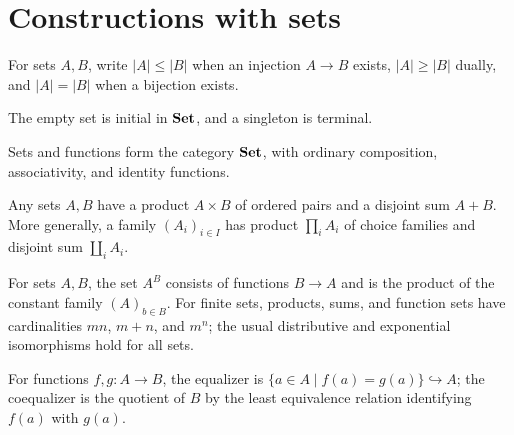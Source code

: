 \section{Constructions with sets}
\begin{definition}
\label{def:lbc-cardinality}
For sets $A,B$, write $|A|\le |B|$ when an injection $A\to B$ exists,
$|A|\ge|B|$ dually, and $|A|=|B|$ when a bijection exists.
\end{definition}

\begin{definition}
\label{def:lbc-empty-singleton}
The empty set is initial in $\mathbf{Set}$, and a singleton is terminal.
\end{definition}

\begin{remark}
\label{rem:lbc-set-category}
Sets and functions form the category $\mathbf{Set}$, with ordinary composition,
associativity, and identity functions.
\end{remark}

\begin{definition}
\label{def:lbc-set-products-sums}
Any sets $A,B$ have a product $A\times B$ of ordered pairs and a disjoint sum
$A+B$. More generally, a family $(A_i)_{i\in I}$ has product
$\prod_iA_i$ of choice families and disjoint sum $\coprod_iA_i$.
\end{definition}

\begin{definition}
\label{def:lbc-set-function-set}
For sets $A,B$, the set $A^B$ consists of functions $B\to A$ and is the
product of the constant family $(A)_{b\in B}$. For finite sets, products, sums,
and function sets have cardinalities $mn$, $m+n$, and $m^n$; the usual
distributive and exponential isomorphisms hold for all sets.
\end{definition}

\begin{definition}
\label{def:lbc-set-equalizer}
For functions $f,g:A\to B$, the equalizer is
$\{a\in A\mid f(a)=g(a)\}\hookrightarrow A$; the coequalizer is the quotient
of $B$ by the least equivalence relation identifying $f(a)$ with $g(a)$.
\end{definition}

